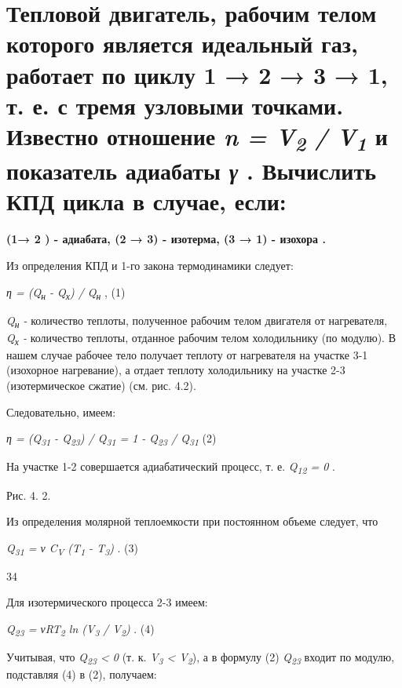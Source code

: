 \section{Тепловой двигатель, рабочим телом которого является
идеальный газ, работает по циклу 1 → 2 → 3 → 1, т. е. с тремя узловыми
точками. Известно отношение \emph{n = V\textsubscript{2} /
V\textsubscript{1}} и показатель адиабаты \emph{γ} . Вычислить КПД цикла
в случае, если:}

\textbf{(1→ 2 ) - адиабата, (2 → 3) - изотерма, (3 → 1) - изохора .}

\solving{}

Из определения КПД и 1-го закона термодинамики следует:

\emph{η = (Q\textsubscript{н} - Q\textsubscript{х}) /
Q\textsubscript{н}} , (1)

\emph{Q\textsubscript{н} -} количество теплоты, полученное рабочим телом
двигателя от нагревателя, \emph{Q\textsubscript{х} -} количество
теплоты, отданное рабочим телом холодильнику (по модулю). В нашем случае
рабочее тело получает теплоту от нагревателя на участке 3-1 (изохорное
нагревание), а отдает теплоту холодильнику на участке 2-3
(изотермическое сжатие) (см. рис. 4.2).

Следовательно, имеем:

\emph{η = (Q\textsubscript{31} - Q\textsubscript{23}) /
Q\textsubscript{31} = 1 - Q\textsubscript{23} / Q\textsubscript{31}} (2)

На участке 1-2 совершается адиабатический процесс, т. е.
\emph{Q\textsubscript{12} = 0} .

Рис. 4. 2.

Из определения молярной теплоемкости при постоянном объеме следует, что

\emph{Q\textsubscript{31} = ν C\textsubscript{V} (T\textsubscript{1} -
T\textsubscript{3})} . (3)

34

Для изотермического процесса 2-3 имеем:

\emph{Q\textsubscript{23} = νRT\textsubscript{2} ln (V\textsubscript{3}
/ V\textsubscript{2})} . (4)

Учитывая, что \emph{Q\textsubscript{23} \textless{} 0} (т. к.
\emph{V\textsubscript{3} \textless{} V\textsubscript{2}}), а в формулу
(2) \emph{Q\textsubscript{23}} входит по модулю, подставляя (4) в (2),
получаем:


